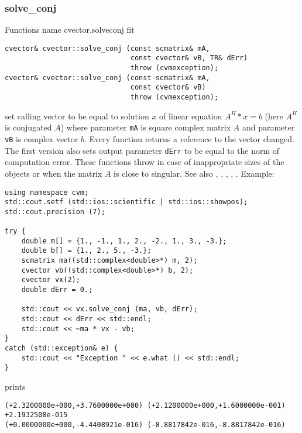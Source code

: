 \subsubsection{solve\_conj}
Functions%
\pdfdest name {cvector.solveconj} fit
\begin{verbatim}
cvector& cvector::solve_conj (const scmatrix& mA,
                              const cvector& vB, TR& dErr)
                              throw (cvmexception);
cvector& cvector::solve_conj (const scmatrix& mA,
                              const cvector& vB)
                              throw (cvmexception);
\end{verbatim}
set calling vector to be equal to solution $x$ of linear equation
$A^H*x=b$ (here $A^H$ is conjugated $A$)
where parameter \verb"mA" is  square complex matrix $A$
and parameter \verb"vB" is  complex vector $b$.
Every function returns a reference to the vector changed.
The first version also sets output parameter \verb"dErr" to be equal
to the norm of computation error.
These functions throw 
in case of inappropriate sizes
of the objects or when the matrix $A$ is close to singular.
See also , , 
, ,
 .
Example:
\begin{Verbatim}
using namespace cvm;
std::cout.setf (std::ios::scientific | std::ios::showpos);
std::cout.precision (7);

try {
    double m[] = {1., -1., 1., 2., -2., 1., 3., -3.};
    double b[] = {1., 2., 5., -3.};
    scmatrix ma((std::complex<double>*) m, 2);
    cvector vb((std::complex<double>*) b, 2);
    cvector vx(2);
    double dErr = 0.;

    std::cout << vx.solve_conj (ma, vb, dErr);
    std::cout << dErr << std::endl;
    std::cout << ~ma * vx - vb;
}
catch (std::exception& e) {
    std::cout << "Exception " << e.what () << std::endl;
}
\end{Verbatim}
prints
\begin{Verbatim}
(+2.3200000e+000,+3.7600000e+000) (+2.1200000e+000,+1.6000000e-001)
+2.1932508e-015
(+0.0000000e+000,-4.4408921e-016) (-8.8817842e-016,-8.8817842e-016)
\end{Verbatim}
\newpage



